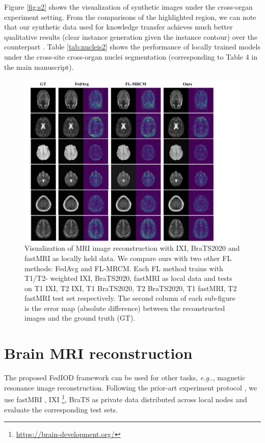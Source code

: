 \documentclass[letterpaper]{article} %
\makeatletter
\DeclareRobustCommand\onedot{\futurelet\@let@token\@onedot}
\def\@onedot{\ifx\@let@token.\else.\null\fi\xspace}
\def\eg{\emph{e.g}\onedot} \def\Eg{\emph{E.g}\onedot}
\makeatother
\begin{document}
Figure \ref{fig:s2} shows the visualization of synthetic images under the cross-organ experiment setting. From the comparisons of the highlighted region, we can note that our synthetic data used for knowledge transfer achieves much better qualitative results (clear instance generation given the instance contour) over the counterpart \cite{chang2020synthetic}. Table \ref{tab:nucleis2} shows the performance of locally trained models under the cross-site cross-organ nuclei segmentation (corresponding to Table 4 in the main manuscript).

\begin{figure}
\centering
\includegraphics[width=\linewidth]{fig/sfig3.pdf}
\caption{Visualization of MRI image reconstruction with IXI, BraTS2020 and fastMRI as locally held data. We compare ours with two other FL methods: FedAvg and FL-MRCM. Each FL method trains with T1/T2-
weighted IXI, BraTS2020, fastMRI as local data and tests on T1  IXI, T2  IXI, T1 BraTS2020, T2 BraTS2020, T1 fastMRI, T2 fastMRI test set respectively. The second column of each sub-figure is the error map (absolute difference) between the reconstructed images and the ground truth (GT).
}

\label{fig:s3}
\end{figure}


\section{Brain MRI reconstruction}
The proposed FedIOD framework can be used for other tasks, \eg, magnetic resonance image reconstruction. Following the prior-art experiment protocol \cite{Guo_2021_CVPR, gong2022federated}, we use fastMRI \cite{zbontar2018fastMRI}, IXI \footnote{\url{https://brain-development.org/}}, BraTS\cite{hdtd-5j88-20} as private data distributed across local nodes and evaluate the corresponding test sets.
\end{document}
